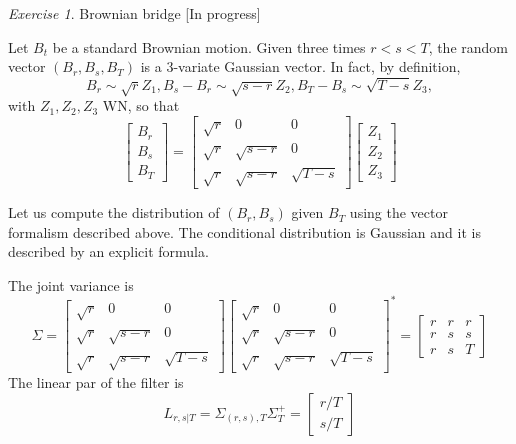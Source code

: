\documentclass[12pt,a4paper]{amsart}
\theoremstyle{plain}%
\theoremstyle{definition}
\theoremstyle{remark}
\newtheorem{exercise}{Exercise}
\begin{document}
\begin{exercise}{Brownian bridge} [In progress]

Let $B_t$ be a standard Brownian motion. Given three times $r < s < T$, the random vector $(B_r,B_s,B_T)$ is a 3-variate Gaussian vector. In fact, by definition,
\begin{equation*}
    B_r \sim \sqrt r Z_1, B_s-B_r \sim \sqrt{s-r} Z_2, B_T-B_s \sim \sqrt{T-s} Z_3,
\end{equation*}
with $Z_1,Z_2,Z_3$ WN, so that
\begin{equation*}
    \begin{bmatrix}
      B_r \\ B _s \\ B_T
    \end{bmatrix} = \begin{bmatrix}
    \sqrt r & 0 & 0 \\
    \sqrt r & \sqrt{s-r} & 0 \\
     \sqrt r & \sqrt{s-r} & \sqrt{T-s}
    \end{bmatrix}
    \begin{bmatrix}
      Z_1 \\ Z_2 \\ Z_3
    \end{bmatrix}
\end{equation*}

Let us compute the distribution of $(B_r,B_s)$ given $B_T$ using the vector formalism described above. The conditional distribution is Gaussian and it is described by an explicit formula.

The joint variance is
\begin{equation*}
   \Sigma = \begin{bmatrix}
    \sqrt r & 0 & 0 \\
    \sqrt r & \sqrt{s-r} & 0 \\
     \sqrt r & \sqrt{s-r} & \sqrt{T-s}
    \end{bmatrix} \begin{bmatrix}
    \sqrt r & 0 & 0 \\
    \sqrt r & \sqrt{s-r} & 0 \\
     \sqrt r & \sqrt{s-r} & \sqrt{T-s}
    \end{bmatrix}^*        = \begin{bmatrix}
      r & r & r \\
      r & s & s \\
      r & s & T 
    \end{bmatrix}
\end{equation*}
The linear par of the filter is
\begin{equation*}
    L_{r,s|T} = \Sigma_{(r,s),T} \Sigma^+_T = \begin{bmatrix}
      r/T \\ s/T
    \end{bmatrix}
\end{equation*}


\end{exercise}
\end{document}
